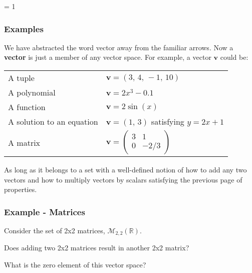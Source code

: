 \documentclass[usenames,dvipsnames,aspectratio=169,10pt]{beamer}
\def \EXAMPLEVERSION {1} %
\numberwithin{equation}{section}
\begin{document}
\ifnum \EXAMPLEVERSION = 1
\begin{frame}
\frametitle{Examples}
We have abstracted the word vector away from the familiar arrows. Now a \textbf{vector} is just a member of any vector space. For example, a vector $\textbf{v}$ could be:
\begin{table}
\begin{tabular}{ll}
A tuple &  $\textbf{v} = (3, \, 4, \, -1, \, 10)$ \\
A polynomial &  $\textbf{v} = 2x^3 - 0.1$ \\
A function &  $\textbf{v} = 2\sin(x)$ \\
A solution to an equation &  $\textbf{v} = (1, \,3)$ satisfying $y=2x+1$ \\
A matrix &  $\textbf{v} = \begin{pmatrix}3 & 1 \\ 0 & -2/3 \end{pmatrix}$
\end{tabular}
\end{table}

As long as it belongs to a set with a well-defined notion of how to add any two vectors and how to multiply vectors by scalars satisfying the previous page of properties.

\end{frame}




\begin{frame}
\frametitle{Example - Matrices}

Consider the set of 2x2 matrices, $\mathcal{M}_{2,2}(\mathbb{R})$.

Does adding two 2x2 matrices result in another 2x2 matrix?

What is the zero element of this vector space?
\end{frame}
\end{document}
